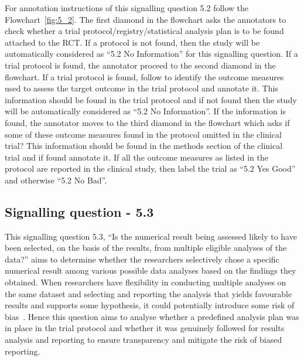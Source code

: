 \documentclass[sn-mathphys,Numbered]{sn-jnl}%
\begin{document}
For annotation instructions of this signalling question 5.2 follow the Flowchart~\ref{fig:5_2}.
The first diamond in the flowchart asks the annotators to check whether a trial protocol/registry/statistical analysis plan is to be found attached to the RCT.
If a protocol is not found, then the study will be automatically considered as ``5.2 No Information'' for this signalling question.
If a trial protocol is found, the annotator proceed to the second diamond in the flowchart.
If a trial protocol is found, follow to identify the outcome measures used to assess the target outcome in the trial protocol and annotate it.
This information should be found in the trial protocol and if not found then the study will be automatically considered as ``5.2 No Information''.
If the information is found, the annotator moves to the third diamond in the flowchart which asks if some of these outcome measures found in the protocol omitted in the clinical trial? 
This information should be found in the methods section of the clinical trial and if found annotate it.
If all the outcome measures as listed in the protocol are reported in the clinical study, then label the trial as ``5.2 Yes Good'' and otherwise ``5.2 No Bad''.

%
%
%
\subsection*{Signalling question - 5.3 }
\label{subsec:5_3}
%
This signalling question 5.3, ``Is the numerical result being assessed likely to have been selected, on the basis of the results, from multiple eligible analyses of the data?'' aims to determine whether the researchers selectively chose a specific numerical result among various possible data analyses based on the findings they obtained.
When researchers have flexibility in conducting multiple analyses on the same dataset and selecting and reporting the analysis that yields favourable results and supports some hypothesis, it could potentially introduce some risk of bias~\cite{swanson2021registration}.
Hence this question aims to analyse whether a predefined analysis plan was in place in the trial protocol and whether it was genuinely followed for results analysis and reporting to ensure transparency and mitigate the risk of biased reporting.
\end{document}
